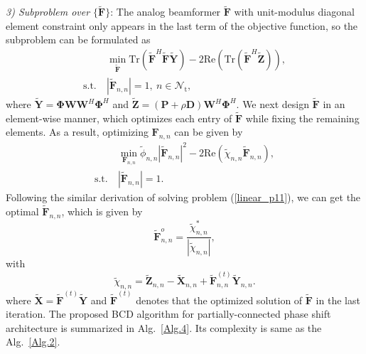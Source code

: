 \documentclass[10pt,journal,twocolumn]{IEEEtran}
\begin{document}
\emph{3) Subproblem over $\big\{\tilde{\mathbf{F}}\big\}$}: The analog beamformer $\tilde{\mathbf{F}}$ with unit-modulus diagonal element constraint only appears in the last term of the objective function, so the subproblem can be formulated as
\begin{subequations}\label{linear_p15}
	\begin{align}
&\min_{\tilde{\mathbf{F}} }\text{Tr}\left(\tilde{\mathbf{F}} ^H\tilde{\mathbf{F}} \tilde{\mathbf{Y}}\right)-2\text{Re}\left(\text{Tr}\left(\tilde{\mathbf{F}} ^H\tilde{\mathbf{Z}}\right)\right),\label{ob_a15}\\
	\text{s.t.}~
 &|\tilde{\mathbf{F}}_{n,n}|=1,~n\in\mathcal{N}_{\text{t}},\label{ob_b15}
	\end{align}
\end{subequations}
where $\tilde{\mathbf{Y}}=\mathbf{\Phi}\mathbf{W}\mathbf{W}^H\mathbf{\Phi}^H$ and $\tilde{\mathbf{Z}}=\left(\mathbf{P}+\rho\mathbf{D}\right)\mathbf{W}^H\mathbf{\Phi}^H$. We next design $\tilde{\mathbf{F}}$ in an element-wise manner, which optimizes each entry of $\tilde{\mathbf{F}}$ while fixing the remaining elements.  As a result, optimizing $\mathbf{F}_{n,n}$ can be given by 
\begin{subequations}\label{linear_p16}
	\begin{align}
&\min_{\mathbf{F}_{n,n}}\tilde{\phi}_{n,n}|\tilde{\mathbf{F}}_{n,n}|^2-2\text{Re}\left(\tilde{\chi}_{n,n}\tilde{\mathbf{F}}_{n,n}\right),\label{ob_a16}\\
\text{s.t.}~
 &|\tilde{\mathbf{F}}_{n,n}|=1.\label{ob_b16}
\end{align}
\end{subequations}
Following the similar derivation of solving problem (\ref{linear_p11}), we can get the optimal $\tilde{\mathbf{F}}_{n,n}$, which is given by
\begin{equation}
\tilde{\mathbf{F}}^o_{n,n}=\frac{\tilde{\chi}^*_{n,n}}{|\tilde{\chi}_{n,n}|},
\label{Optimal_analog_2}
\end{equation} 
with 
\begin{equation}
\tilde{\chi}_{n,n}=\tilde{\mathbf{Z}}_{n,n}-\tilde{\mathbf{X}}_{n,n} + \tilde{\mathbf{F}}^{(t)}_{n,n}\tilde{\mathbf{Y}}_{n,n}.
\end{equation}
where $\tilde{\mathbf{X}} = \tilde{\mathbf{F}}^{(t)}\tilde{\mathbf{Y}}$ and $\tilde{\mathbf{F}}^{(t)}$ denotes that the optimized solution of $\tilde{\mathbf{F}}$ in the last iteration. The proposed BCD algorithm for partially-connected phase shift architecture is summarized in Alg.~\ref{Alg.4}. Its complexity is same as the Alg.~\ref{Alg.2}.
\end{document}
